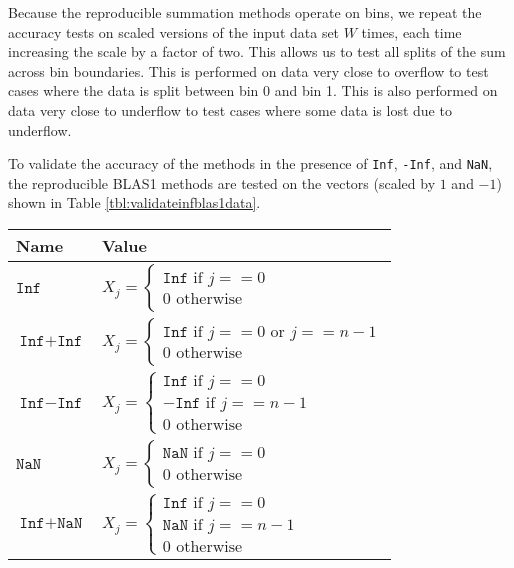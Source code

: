   Because the reproducible summation methods operate on bins, we repeat the accuracy tests on scaled versions of the input data set $W$ times, each time increasing the scale by a factor of two. This allows us to test all splits of the sum across bin boundaries. This is performed on data very close to overflow to test cases where the data is split between bin 0 and bin 1. This is also performed on data very close to underflow to test cases where some data is lost due to underflow.

  To validate the accuracy of the methods in the presence of \texttt{Inf}, \texttt{-Inf}, and \texttt{NaN}, the reproducible BLAS1 methods are tested on the vectors (scaled by $1$ and $-1$) shown in Table \ref{tbl:validateinfblas1data}.
    \begin{table}[!htbp]
        \centering
        \begin{tabular}{ | l |  l |} \hline
            Name & Value\\ \hline
            $\texttt{Inf}$ & $X_j = \begin{cases} \texttt{Inf} \text{ if } j == 0 \\ 0 \text{ otherwise} \end{cases}$ \\ \hline
            $\texttt{Inf} + \texttt{Inf}$ & $X_j = \begin{cases} \texttt{Inf} \text{ if } j == 0 \text{ or } j == n - 1 \\ 0 \text{ otherwise} \end{cases}$\\ \hline
            $\texttt{Inf} - \texttt{Inf}$ & $X_j = \begin{cases} \texttt{Inf} \text{ if } j == 0 \\ -\texttt{Inf} \text{ if } j == n - 1 \\ 0 \text{ otherwise} \end{cases}$\\ \hline
            $\texttt{NaN}$ & $X_j = \begin{cases} \texttt{NaN} \text{ if } j == 0 \\ 0 \text{ otherwise} \end{cases}$\\ \hline
            $\texttt{Inf} + \texttt{NaN}$ & $X_j = \begin{cases} \texttt{Inf} \text{ if } j == 0 \\ \texttt{NaN} \text{ if } j == n - 1 \\ 0 \text{ otherwise} \end{cases}$\\ \hline

\end{tabular}
\end{table}
